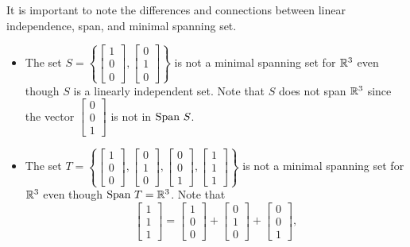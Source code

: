 It is important to note the differences and connections between linear independence, span, and minimal spanning set. 
\begin{itemize}
\item The set $S = \left\{ \left[ \begin{array}{c} 1 \\ 0 \\ 0 \end{array} \right], \left[ \begin{array}{c} 0 \\ 1 \\ 0 \end{array} \right] \right\}$ is not a minimal spanning set for $\mathbb{R}^3$ even though $S$ is a linearly independent set. Note that $S$ does not span $\mathbb{R}^3$ since the vector $\left[ \begin{array}{c} 0 \\ 0 \\ 1 \end{array} \right] $ is not in $\text{Span} \ S$. 
\item The set $T = \left\{ \left[ \begin{array}{c} 1 \\ 0 \\ 0 \end{array} \right], \left[ \begin{array}{c} 0 \\ 1 \\ 0 \end{array} \right] , \left[ \begin{array}{c} 0 \\ 0 \\ 1 \end{array} \right] , \left[ \begin{array}{c} 1 \\ 1 \\ 1 \end{array} \right] \right\}$ is not a minimal spanning set for $\mathbb{R}^3$ even though $\text{Span} \ T = \mathbb{R}^3$. Note that 
\[\left[ \begin{array}{c} 1 \\ 1 \\ 1 \end{array} \right] = \left[ \begin{array}{c} 1 \\ 0 \\ 0 \end{array} \right] + \left[ \begin{array}{c} 0 \\ 1 \\ 0 \end{array} \right] + \left[ \begin{array}{c} 0 \\ 0 \\ 1 \end{array} \right], \]

\end{itemize}
